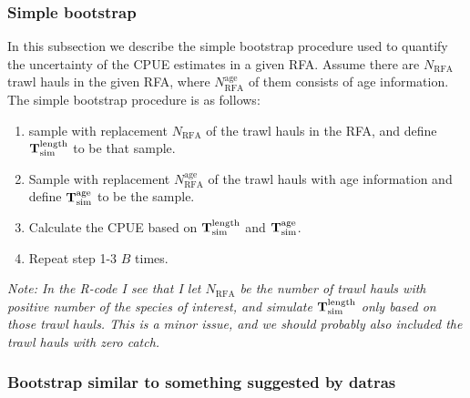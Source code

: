 \documentclass[a4paper 12pt]{article}
\numberwithin{equation}{section}
\begin{document}
\subsubsection{Simple bootstrap}
\label{simpleboot}

In this subsection we describe the simple bootstrap procedure used to quantify the uncertainty of the CPUE estimates in a given RFA. Assume there are $N_{\text{RFA}}$ trawl hauls in the given RFA, where $N_{\text{RFA}}^{\text{age}}$ of them consists of age information. The simple bootstrap procedure is as follows:

\begin{enumerate}
\item sample with replacement $N_{\text{RFA}}$ of the trawl hauls in the RFA, and define ${\bf T}_{\text{sim}}^{\text{length}}$ to be that sample.
\item Sample with replacement $N_{\text{RFA}}^{\text{age}}$ of the trawl hauls with age information and define ${\bf T}_{\text{sim}}^{\text{age}}$ to be the sample.
\item Calculate the CPUE based on ${\bf T }_{\text{sim}}^{\text{length}}$ and ${\bf T}_{\text{sim}}^{\text{age}}$. 
\item Repeat step 1-3 $B$ times.
\end{enumerate}  

\textit{Note: In the R-code I see that I let $N_{\text{RFA}}$ be the number of trawl hauls with positive number of the species of interest, and simulate ${\bf T}_{\text{sim}}^{\text{length}}$ only based on those trawl hauls. This is a minor issue, and we should probably also included the trawl hauls with zero catch.}


\subsubsection{Bootstrap similar to something suggested by datras} 
\label{datrasboot} 
\end{document}

